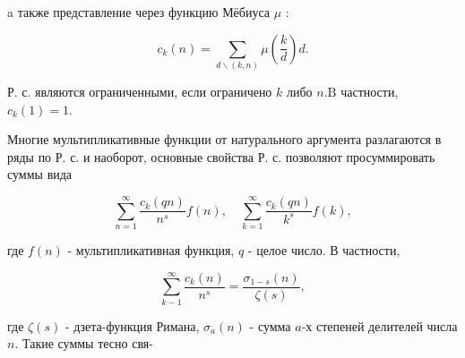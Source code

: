 \documentclass[10pt]{article}
\begin{document}
a также представление через функцию Мёбиуса $\mu$ :



\[

c_{k}(n)=\sum_{d \backslash(k, n)} \mu\left(\frac{k}{d}\right) d .

\]



Р. с. являются ограниченными, если ограничено $k$ либо $n . \mathrm{B}$ частности, $c_{k}(1)=1$.



Многие мультипликативные функции от натурального аргумента разлагаются в ряды по Р. с. и наоборот, основные свойства Р. с. позволяют просуммировать суммы вида



\[

\sum_{n=1}^{\infty} \frac{c_{k}(q n)}{n^{s}} f(n), \quad \sum_{k=1}^{\infty} \frac{c_{k}(q n)}{k^{s}} f(k),

\]



где $f(n)$ - мультипликативная функция, $q$ - целое число. В частности,



\[

\sum_{k-1}^{\infty} \frac{c_{k}(n)}{n^{s}}=\frac{\sigma_{1-s}(n)}{\zeta(s)},

\]



где $\zeta(s)$ - дзета-функция Римана, $\sigma_{a}(n)$ - сумма $a$-х степеней делителей числа $n$. Такие суммы тесно свя-
\end{document}
